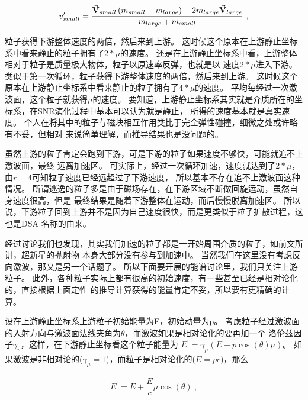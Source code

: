 \begin{equation}
    \begin{aligned}
      v_{small}^{\prime}=\dfrac{\vec{\bold{V}}_{small}\left(m_{small}-m_{large}\right)+2
      m_{large} \vec{\bold{V}}_{large}}{m_{large}+m_{small}}\ ,
    \end{aligned}
\end{equation}

粒子获得下游整体速度的两倍，然后来到上游。
这时候这个原本在上游静止坐标系中看来静止的粒子拥有了$2*\mu$的速度。
还是在上游静止坐标系中看，上游整体相对于粒子是质量极大物体，粒子以原速率反弹，也就是以
速度$2*\mu$进入下游。
类似于第一次循环，粒子获得下游整体速度的两倍，然后来到上游。
这时候这个原本在上游静止坐标系中看来静止的粒子拥有了$4*\mu$的速度。
平均每经过一次激波面，这个粒子就获得$\mu$的速度。
要知道，上游静止坐标系其实就是介质所在的坐标系，在SNR演化过程中基本可以认为就是静止，
所得的速度基本就是真实速度。
个人在将其中的粒子与磁块相互作用类比于完全弹性碰撞，细微之处或许略有不妥，但相对
来说简单理解，而推导结果也是没问题的。

虽然上游的粒子肯定会跑到下游，可是下游的粒子如果速度不够快，可能就追不上激波面，最终
远离加速区。
可实际上，经过一次循环加速，速度就达到了$2*\mu$，由$r=4$可知粒子速度已经远超过了下游速度，
所以基本不存在追不上激波面这种情况。
所谓逃逸的粒子多是由于磁场存在，在下游区域不断做回旋运动，虽然自身速度很高，但是
最终结果是随着下游整体在运动，而后慢慢脱离加速区。
所以说，下游粒子回到上游并不是因为自己速度很快，而是更类似于粒子扩散过程，这也是DSA
名称的由来。

经过讨论我们也发现，其实我们加速的粒子都是一开始周围介质的粒子，如前文所讲，超新星的抛射物
本身大部分没有参与到加速中。
当然我们在这里没有考虑反向激波，那又是另一个话题了。
所以下面要开展的能谱讨论里，我们只关注上游粒子。
此外，各种粒子实际上都有很高的初始速度，有一些甚至已经是相对论化的，直接根据上面定性
的推导计算获得的能量肯定不妥，所以要有更精确的计算。

设在上游静止坐标系上游粒子初始能量为E，初始动量为p。
考虑粒子经过激波面的入射方向与激波面法线夹角为$\theta$，而激波如果是相对论化的要再加一个
洛伦兹因子$\gamma_v$，这样，在下游静止坐标看这个粒子能量为
$E^{\prime}=\gamma_{\mu}(E+p \cos (\theta)\mu )$。
如果激波是非相对论的($\gamma_{\mu}=1$)，而粒子是相对论化的($E=pc$)，那么

\begin{equation}
    \begin{aligned}
      E^{\prime}=E+\dfrac{E}{c} \mu \cos (\theta)\ ,
    \end{aligned}
\end{equation}

